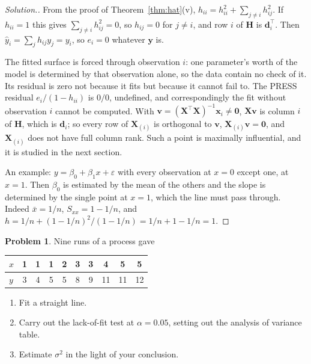 \documentclass[11pt,a4paper]{article}
\numberwithin{equation}{section}
\theoremstyle{definition}
\newtheorem{problemx}{Problem}[subsection]
\newenvironment{problem}{\begin{problemx}}{\end{problemx}}
\newenvironment{solution}
  {\renewcommand{\qedsymbol}{}\begin{proof}[\textit{Solution}.]}
  {\end{proof}}
\begin{document}
\begin{solution}
From the proof of Theorem~\ref{thm:hat}(v),
$h_{ii} = h_{ii}^2 + \sum_{j \neq i}h_{ij}^2$. If $h_{ii} = 1$ this gives
$\sum_{j \neq i}h_{ij}^2 = 0$, so $h_{ij} = 0$ for $j \neq i$, and row $i$ of $\mathbf{H}$
is $\mathbf{d}_i^\top$. Then $\hat y_i = \sum_j h_{ij}y_j = y_i$, so $e_i = 0$ whatever
$\mathbf{y}$ is.

The fitted surface is forced through observation $i$: one parameter's worth of the model is
determined by that observation alone, so the data contain no check of it. Its residual is
zero not because it fits but because it cannot fail to. The PRESS residual
$e_i/(1 - h_{ii})$ is $0/0$, undefined, and correspondingly the fit without observation $i$
cannot be computed. With $\mathbf{v} = (\mathbf{X}^\top\mathbf{X})^{-1}\mathbf{x}_i \neq \mathbf{0}$,
$\mathbf{Xv}$ is column $i$ of $\mathbf{H}$, which is $\mathbf{d}_i$; so every row of
$\mathbf{X}_{(i)}$ is orthogonal to $\mathbf{v}$, $\mathbf{X}_{(i)}\mathbf{v} = \mathbf{0}$, and
$\mathbf{X}_{(i)}$ does not have full column rank. Such a point is maximally influential, and it is studied in the next section.

An example: $y = \beta_0 + \beta_1 x + \varepsilon$ with every observation at $x = 0$ except
one, at $x = 1$. Then $\beta_0$ is estimated by the mean of the others and the slope is
determined by the single point at $x = 1$, which the line must pass through. Indeed
$\bar x = 1/n$, $S_{xx} = 1 - 1/n$, and
$h = 1/n + (1 - 1/n)^2/(1 - 1/n) = 1/n + 1 - 1/n = 1$.
\end{solution}

\begin{problem}\label{prob:lof2}
Nine runs of a process gave
\begin{center}
\begin{tabular}{l|ccccccccc}
$x$ & 1 & 1 & 1 & 2 & 3 & 3 & 4 & 5 & 5 \\
\hline
$y$ & 3 & 4 & 5 & 5 & 8 & 9 & 11 & 11 & 12 \\
\end{tabular}
\end{center}
\begin{enumerate}[label=(\alph*)]
\item Fit a straight line.
\item Carry out the lack-of-fit test at $\alpha = 0.05$, setting out the analysis of variance
table.
\item Estimate $\sigma^2$ in the light of your conclusion.
\end{enumerate}
\end{problem}
\end{document}
